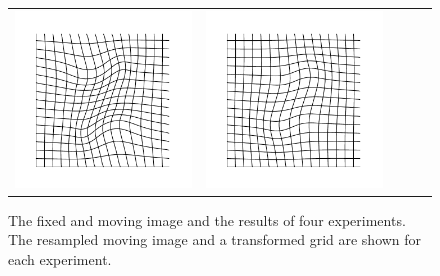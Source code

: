 \begin{figure}[!tb]
\begin{tabular}{c@{}c@{}c@{}c@{}c}
  \includegraphics[scale=0.18,trim={5ex 5ex 5ex 5ex},clip=true]{ScriptedImages/itkv4_SVF_ANTSCC_Displacement.pdf}&
  \includegraphics[scale=0.18,trim={5ex 5ex 5ex 5ex},clip=true]{ScriptedImages/itkv4_SVF_MSD_Displacement.pdf}
\end{tabular}
\caption{The fixed and moving image and the results of four
experiments. The resampled moving image and a transformed grid are
shown for each experiment.}\label{fig:results}
\end{figure}
